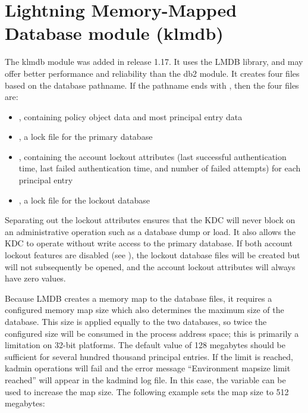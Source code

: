 \documentclass[letterpaper,10pt,english]{sphinxmanual}
\begin{document}
\section{Lightning Memory-Mapped Database module (klmdb)}
\label{\detokenize{admin/dbtypes:lightning-memory-mapped-database-module-klmdb}}
The klmdb module was added in release 1.17.  It uses the LMDB library,
and may offer better performance and reliability than the db2 module.
It creates four files based on the database pathname.  If the pathname
ends with , then the four files are:
\begin{itemize}
\item {} 
, containing policy object data and most principal
entry data

\item {} 
, a lock file for the primary database

\item {} 
, containing the account lockout attributes
(last successful authentication time, last failed authentication
time, and number of failed attempts) for each principal entry

\item {} 
, a lock file for the lockout database

\end{itemize}

Separating out the lockout attributes ensures that the KDC will never
block on an administrative operation such as a database dump or load.
It also allows the KDC to operate without write access to the primary
database.  If both account lockout features are disabled (see
{\hyperref[\detokenize{admin/lockout:disable-lockout}]{}}), the lockout database files will be created
but will not subsequently be opened, and the account lockout
attributes will always have zero values.

Because LMDB creates a memory map to the database files, it requires a
configured memory map size which also determines the maximum size of
the database.  This size is applied equally to the two databases, so
twice the configured size will be consumed in the process address
space; this is primarily a limitation on 32-bit platforms.  The
default value of 128 megabytes should be sufficient for several
hundred thousand principal entries.  If the limit is reached, kadmin
operations will fail and the error message “Environment mapsize limit
reached” will appear in the kadmind log file.  In this case, the
 variable can be used to increase the map size.  The
following example sets the map size to 512 megabytes:
\end{document}
